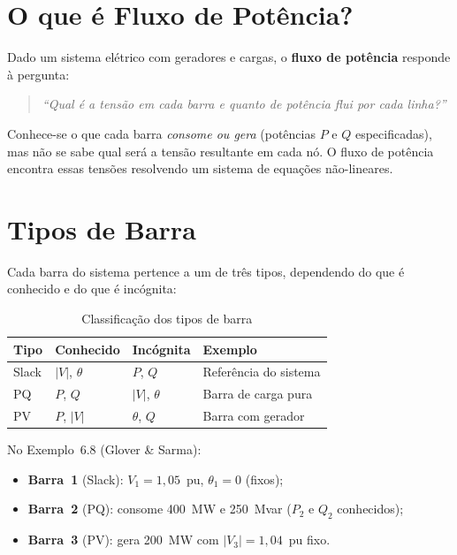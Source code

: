 \documentclass[
  12pt,
  a4paper,
  oneside,
  brazil
]{abntex2}
\begin{document}
\imprimircapa

\tableofcontents
\newpage

\chapter{O que é Fluxo de Potência?}

Dado um sistema elétrico com geradores e cargas, o \textbf{fluxo de potência}
responde à pergunta:

\begin{quote}
  \textit{``Qual é a tensão em cada barra e quanto de potência flui por cada linha?''}
\end{quote}

Conhece-se o que cada barra \emph{consome ou gera} (potências $P$ e $Q$
especificadas), mas não se sabe qual será a tensão resultante em cada nó.
O fluxo de potência encontra essas tensões resolvendo um sistema de
equações não-lineares.

\chapter{Tipos de Barra}

Cada barra do sistema pertence a um de três tipos, dependendo do que é
conhecido e do que é incógnita:

\begin{table}[h]
  \centering
  \caption{Classificação dos tipos de barra}
  \begin{tabular}{llll}
    \toprule
    \textbf{Tipo} & \textbf{Conhecido} & \textbf{Incógnita} & \textbf{Exemplo} \\
    \midrule
    Slack & $|V|$, $\theta$ & $P$, $Q$ & Referência do sistema \\
    PQ    & $P$, $Q$        & $|V|$, $\theta$ & Barra de carga pura \\
    PV    & $P$, $|V|$      & $\theta$, $Q$   & Barra com gerador \\
    \bottomrule
  \end{tabular}
\end{table}

No Exemplo~6.8 (Glover \& Sarma):

\begin{itemize}
  \item \textbf{Barra~1} (Slack): $V_1 = 1{,}05$~pu, $\theta_1 = 0$ (fixos);
  \item \textbf{Barra~2} (PQ): consome 400~MW e 250~Mvar ($P_2$ e $Q_2$ conhecidos);
  \item \textbf{Barra~3} (PV): gera 200~MW com $|V_3| = 1{,}04$~pu fixo.
\end{itemize}
\end{document}
